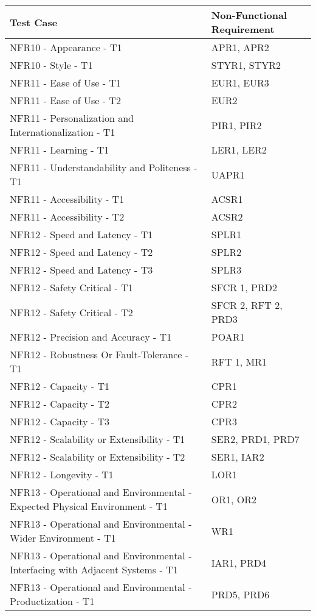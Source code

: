 \documentclass[12pt, titlepage]{article}
\begin{document}
\begin{tabularx}{\textwidth}{p{7cm}p{7cm}}
\toprule {\bf Test Case} & {\bf Non-Functional Requirement}\\
\midrule
{NFR10 - Appearance -  T1} & {APR1, APR2} \\
{NFR10 - Style - T1} & {STYR1, STYR2} \\
{NFR11 - Ease of Use - T1} & {EUR1, EUR3} \\
{NFR11 - Ease of Use - T2} & {EUR2} \\
{NFR11 - Personalization and Internationalization - T1} & {PIR1, PIR2} \\
{NFR11 - Learning - T1} & {LER1, LER2} \\
{NFR11 - Understandability and Politeness - T1} & {UAPR1} \\
{NFR11 - Accessibility - T1} & {ACSR1} \\
{NFR11 - Accessibility - T2} & {ACSR2} \\
{NFR12 - Speed and Latency - T1} & {SPLR1} \\
{NFR12 - Speed and Latency - T2} & {SPLR2} \\
{NFR12 - Speed and Latency - T3} & {SPLR3} \\
{NFR12 - Safety Critical - T1} & {SFCR 1, PRD2} \\
{NFR12 - Safety Critical - T2} & {SFCR 2, RFT 2, PRD3} \\
{NFR12 - Precision and Accuracy - T1} & {POAR1} \\
{NFR12 - Robustness Or Fault-Tolerance - T1} & {RFT 1, MR1} \\
{NFR12 - Capacity - T1} & {CPR1} \\
{NFR12 - Capacity - T2} & {CPR2} \\
{NFR12 - Capacity - T3} & {CPR3} \\
{NFR12 - Scalability or Extensibility - T1} & {SER2, PRD1, PRD7} \\
{NFR12 - Scalability or Extensibility - T2} & {SER1, IAR2} \\
{NFR12 - Longevity - T1} & {LOR1} \\
{NFR13 - Operational and Environmental - Expected Physical Environment - T1} & {OR1, OR2} \\
{NFR13 - Operational and Environmental - Wider Environment - T1} & {WR1} \\
{NFR13 - Operational and Environmental - Interfacing with Adjacent Systems - T1 } & {IAR1, PRD4} \\
{NFR13 - Operational and Environmental - Productization - T1} & {PRD5, PRD6} \\

\end{tabularx}
\end{document}
